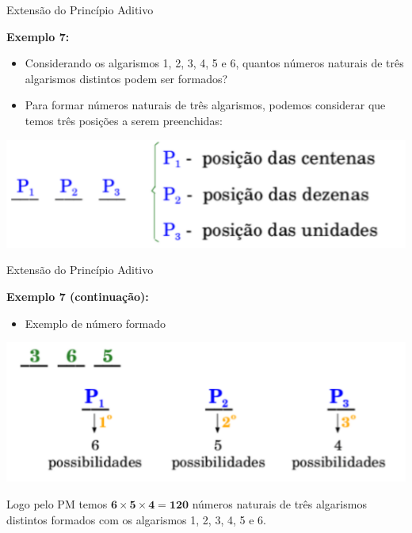 \documentclass[aspectratio=169]{beamer}
\begin{document}
\begin{frame}{Extensão do Princípio Aditivo}

    \textbf{Exemplo 7:}

\begin{itemize}
    \item Considerando os algarismos 1, 2, 3, 4, 5 e 6, quantos
    números naturais de três algarismos distintos podem ser
    formados?
    
    \vspace{4mm}
    \item[] Para formar números naturais de três algarismos, podemos considerar que temos três posições a serem preenchidas:
\end{itemize}

\vspace{3mm}

\begin{center}
    \includegraphics[width=0.8\linewidth]{figs/3digitos.png}
\end{center}
\end{frame}


\begin{frame}{Extensão do Princípio Aditivo}

    \textbf{Exemplo 7 (continuação):}

\begin{itemize}
    \item Exemplo de número formado
\end{itemize}

\vspace{3mm}

\begin{center}
    \includegraphics[width=0.8\linewidth]{figs/3digitos2.png}
\end{center}

Logo pelo PM temos $\boldsymbol{6 \times 5 \times 4 = 120}$ números naturais de três
algarismos distintos formados com os algarismos 1, 2, 3, 4, 5 e
6.
\end{frame}
\end{document}
